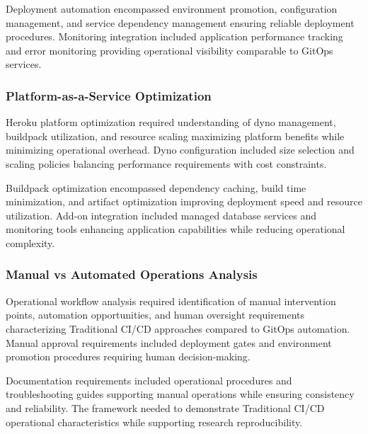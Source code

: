 
Deployment automation encompassed environment promotion, configuration management, and service dependency management ensuring reliable deployment procedures. Monitoring integration included application performance tracking and error monitoring providing operational visibility comparable to GitOps services.

\subsubsection{Platform-as-a-Service Optimization}
Heroku platform optimization required understanding of dyno management, buildpack utilization, and resource scaling maximizing platform benefits while minimizing operational overhead. Dyno configuration included size selection and scaling policies balancing performance requirements with cost constraints.

Buildpack optimization encompassed dependency caching, build time minimization, and artifact optimization improving deployment speed and resource utilization. Add-on integration included managed database services and monitoring tools enhancing application capabilities while reducing operational complexity.

\subsubsection{Manual vs Automated Operations Analysis}
Operational workflow analysis required identification of manual intervention points, automation opportunities, and human oversight requirements characterizing Traditional CI/CD approaches compared to GitOps automation. Manual approval requirements included deployment gates and environment promotion procedures requiring human decision-making.


Documentation requirements included operational procedures and troubleshooting guides supporting manual operations while ensuring consistency and reliability. The framework needed to demonstrate Traditional CI/CD operational characteristics while supporting research reproducibility.



